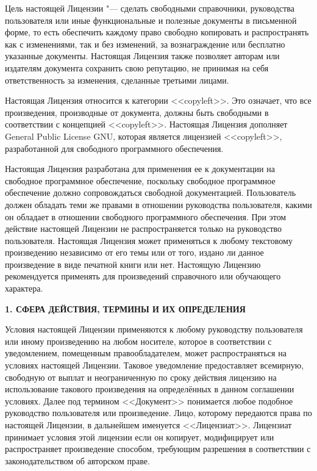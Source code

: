 Цель настоящей Лицензии "--- сделать свободными справочники, руководства
пользователя или иные функциональные и полезные документы в письменной
форме, то есть обеспечить каждому право свободно копировать и
распространять как с изменениями, так и без изменений, за вознаграждение
или бесплатно указанные документы. Настоящая Лицензия также позволяет
авторам или издателям документа сохранить свою репутацию, не принимая на
себя ответственность за изменения, сделанные третьими лицами.

Настоящая Лицензия относится к категории <<copyleft>>. Это означает, что
все произведения, производные от документа, должны быть свободными в
соответствии с концепцией <<copyleft>>. Настоящая Лицензия дополняет
General Public License GNU, которая является лицензией <<copyleft>>,
разработанной для свободного программного обеспечения.

Настоящая Лицензия разработана для применения ее к документации на
свободное программное обеспечение, поскольку свободное программное
обеспечение должно сопровождаться свободной документацией. Пользователь
должен обладать теми же правами в отношении руководства пользователя,
какими он обладает в отношении свободного программного обеспечения. При
этом действие настоящей Лицензии не распространяется только на
руководство пользователя. Настоящая Лицензия может применяться к любому
текстовому произведению независимо от его темы или от того, издано ли
данное произведение в виде печатной книги или нет. Настоящую Лицензию
рекомендуется применять для произведений справочного или обучающего
характера.


\begin{center}
{\Large\bf 1. СФЕРА ДЕЙСТВИЯ, ТЕРМИНЫ И ИХ ОПРЕДЕЛЕНИЯ\par}
\end{center}

Условия настоящей Лицензии применяются к любому руководству пользователя
или иному произведению на любом носителе, которое в соответствии с
уведомлением, помещенным правообладателем, может распространяться на
условиях настоящей Лицензии. Таковое уведомление предоставляет всемирную,
свободную от выплат и неограниченную по сроку действия лицензию на
использование такового произведения на определённых в данном соглашении
условиях. Далее под термином <<Документ>> понимается любое подобное
руководство пользователя или произведение. Лицо, которому передаются
права по настоящей Лицензии, в дальнейшем именуется <<Лицензиат>>.
Лицензиат принимает условия этой лицензии если он копирует, модифицирует
или распространяет произведение способом, требующим разрешения в
соответствии с законодательством об авторском праве.

